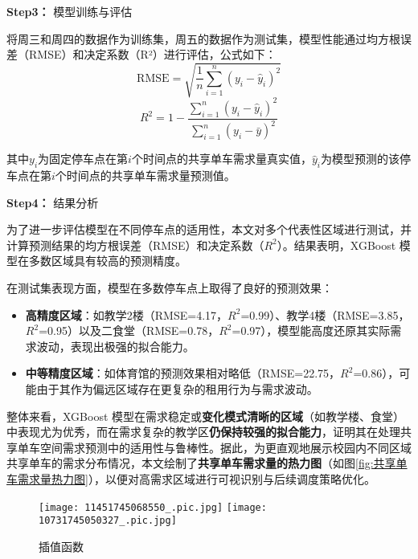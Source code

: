 \documentclass[withoutpreface,bwprint]{cumcmthesis}
\begin{document}
\textbf{Step3：} 模型训练与评估

将周三和周四的数据作为训练集，周五的数据作为测试集，模型性能通过均方根误差（RMSE）和决定系数（R²）进行评估，公式如下：
\begin{equation}
    \text{RMSE} = \sqrt{\frac{1}{n} \sum_{i=1}^{n} (y_i - \hat{y}_i)^2}
\end{equation}
\begin{equation}
    R^2 = 1 - \frac{\sum_{i=1}^{n}(y_i - \hat{y}_i)^2}{\sum_{i=1}^{n}(y_i - \bar{y})^2}
\end{equation}\par
其中$y_i$为固定停车点在第$i$个时间点的共享单车需求量真实值，$\hat{y}_i$为模型预测的该停车点在第$i$个时间点的共享单车需求量预测值。

\textbf{Step4：} 结果分析

为了进一步评估模型在不同停车点的适用性，本文对多个代表性区域进行测试，并计算预测结果的均方根误差（RMSE）和决定系数（$R^2$）。结果表明，XGBoost 模型在多数区域具有较高的预测精度。

在测试集表现方面，模型在多数停车点上取得了良好的预测效果：

\begin{itemize}
    \item \textbf{高精度区域}：如教学2楼（RMSE=4.17，$R^2$=0.99）、教学4楼（RMSE=3.85，$R^2$=0.95）以及二食堂（RMSE=0.78，$R^2$=0.97），模型能高度还原其实际需求波动，表现出极强的拟合能力。
    \item \textbf{中等精度区域}：如体育馆的预测效果相对略低（RMSE=22.75，$R^2$=0.86），可能由于其作为偏远区域存在更复杂的租用行为与需求波动。
\end{itemize}

整体来看，XGBoost 模型在需求稳定或\textbf{变化模式清晰的区域}（如教学楼、食堂）中表现尤为优秀，而在需求复杂的教学区\textbf{仍保持较强的拟合能力}，证明其在处理共享单车空间需求预测中的适用性与鲁棒性。据此，为更直观地展示校园内不同区域共享单车的需求分布情况，本文绘制了\textbf{共享单车需求量的热力图}（如图\ref{fig:共享单车需求量热力图}），以便对高需求区域进行可视识别与后续调度策略优化。

\begin{figure}[H]
\centering
{}
{\texttt{[image: 11451745068550\_.pic.jpg]}}
{\texttt{[image: 10731745050327\_.pic.jpg]}}
\caption{插值函数}\label{fig:插值函数}
\end{figure}
\end{document}
